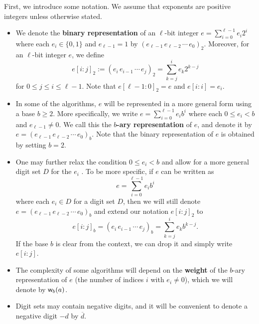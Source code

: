 First, we introduce some notation. We assume that exponents are positive integers unless 
otherwise stated. 
\begin{itemize}
    \item We denote the {\bf binary representation} of an $\ell$-bit integer $e = \sum_{i=0}^{\ell-1} e_i 2^i$
    where each $e_i \in \{0, 1\}$ and $e_{\ell-1} = 1$ by $(e_{\ell-1}\,e_{\ell-2}\,\cdots\,e_0)_2$. 
    Moreover, for an $\ell$-bit integer $e$, we define 
    \[ e[i : j]_2 := (e_i\,e_{i-1}\,\cdots\,e_j)_2 = \sum_{k=j}^i e_k 2^{k-j} \]
    for $0 \leq j \leq i \leq \ell-1$. Note that $e[\ell-1 : 0]_2 = e$ and $e[i : i] = e_i$.
    \item In some of the algorithms, $e$ will be represented in a more general form using a base 
    $b \geq 2$. More specifically, we write $e = \sum_{i=0}^{\ell-1} e_i b^i$ where each 
    $0 \leq e_i < b$ and $e_{\ell-1} \neq 0$. We call this the 
    {\bf $b$-ary representation} of $e$, and denote it by $e = (e_{\ell-1}\,e_{\ell-2}\,\cdots\,e_0)_b$.
    Note that the binary representation of $e$ is obtained by setting $b = 2$. 
    \item One may further relax the condition $0 \leq e_i < b$ and allow for a more general 
    digit set $D$ for the $e_i$ \cite{10.1145/322344.322355}. To be more specific, if $e$ can be written as 
    \[ e = \sum_{i=0}^{\ell-1} e_i b^i \]
    where each $e_i \in D$ for a digit set $D$, then we will still denote $e = (e_{\ell-1}\,e_{\ell-2}\,\cdots\,e_0)_b$ and extend our notation $e[i : j]_2$ to 
    \[ e[i : j]_b = (e_i\,e_{i-1}\,\cdots\,e_j)_b = \sum_{k=j}^i e_k b^{k-j}. \]
    If the base $b$ is clear from the context, we can drop it and simply write $e[i : j]$. 
    \item The complexity of some algorithms will depend on the {\bf weight} of the $b$-ary 
    representation of $e$ (the number of indices $i$ with $e_i \neq 0$), which we will denote by 
    ${\sf w}_b(a)$. 
    \item Digit sets may contain negative digits, and it will be convenient to denote a negative 
    digit $-d$ by $\overline{d}$. 
\end{itemize}

